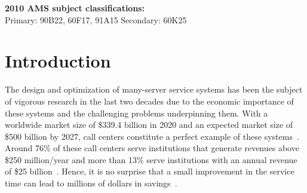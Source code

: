 \documentclass[a4paper,11pt,twoside]{article}
\numberwithin{equation}{section}
\numberwithin{figure}{section}
\theoremstyle{plain}
\newcommand{\1}{\mathbbm{1}}
\begin{document}
\vspace{0.3cm}

\noindent
{\bf 2010 AMS subject classifications:}\\
Primary: 90B22, 60F17, 91A15
Secondary: 60K25

\footnotesize
\setcounter{tocdepth}{2}
\tableofcontents
\normalsize

\section{Introduction}

The design and optimization of many-server service systems has been the subject of vigorous research in the last two decades due to the economic importance of these systems and the challenging problems underpinning them. With a worldwide market size of \$339.4 billion in 2020 and an expected market size of \$500 billion by 2027, call centers constitute a perfect example of these systems~\cite{statista2020}.  Around 76\% of these call centers serve institutions that generate revenues above \$250 million/year and more than 13\% serve institutions with an annual revenue of \$25 billion~\cite{deloitte2017}. Hence, it is no surprise that a small improvement in the service time can lead to millions of dollars in savings~\cite{Gans2010}. 
\end{document}
